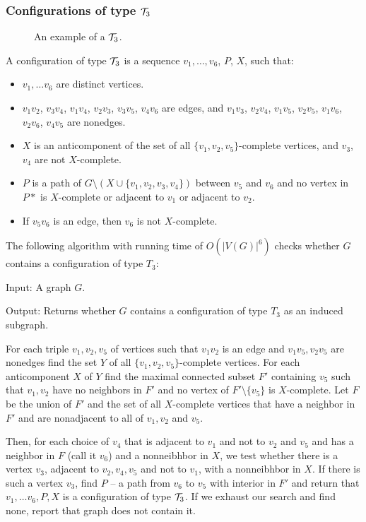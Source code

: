 \subsubsection{Configurations of type $\mathcal{T}_3$}

\begin{wrapfigure}{r}{0.35\textwidth}
	
	\caption{An example of a $\mathcal{T}_3$.}%
	\vspace{-1.5cm}
\end{wrapfigure}

A configuration of type $\mathcal{T}_3$ is a sequence $v_1, \ldots, v_6$, $P$, $X$, such that:
\begin{itemize}
	\item $v_1, \ldots v_6$ are distinct vertices.
	\item $v_1v_2$, $v_3v_4$, $v_1v_4$, $v_2v_3$, $v_3v_5$, $v_4v_6$ are edges, and $v_1v_3$, $v_2v_4$, $v_1v_5$, $v_2v_5$, $v_1v_6$, $v_2v_6$, $v_4v_5$ are nonedges.
	\item $X$ is an anticomponent of the set of all $\{v_1, v_2, v_5\}$-complete vertices, and $v_3$, $v_4$ are not $X$-complete.
	\item $P$ is a path of $G \setminus ( X \cup \{v_1, v_2, v_3, v_4\} )$ between $v_5$ and $v_6$ and no vertex in $P*$ is $X$-complete or adjacent to $v_1$ or adjacent to $v_2$.
	\item If $v_5v_6$ is an edge, then $v_6$ is not $X$-complete.
\end{itemize}

The following algorithm with running time of $O(|V(G)|^6)$ checks whether $G$ contains a configuration of type $T_3$:

\begin{alg}
	\label{alg:t3}
	Input: A graph $G$.

	\noindent Output: Returns whether $G$ contains a configuration of type $T_3$ as an induced subgraph.
\end{alg}
\begin{algtext2}

	For each triple $v_1, v_2, v_5$ of vertices such that $v_1v_2$ is an edge and $v_1v_5, v_2v_5$ are nonedges find the set $Y$ of all $\{v_1, v_2, v_5\}$-complete vertices. For each anticomponent $X$ of $Y$ find the maximal connected subset $F'$ containing $v_5$ such that $v_1, v_2$ have no neighbors in $F'$ and no vertex of $F'\setminus\{v_5\}$ is $X$-complete. Let $F$ be the union of $F'$ and the set of all $X$-complete vertices that have a neighbor in $F'$ and are nonadjacent to all of $v_1, v_2$ and $v_5$.

	Then, for each choice of $v_4$ that is adjacent to $v_1$ and not to $v_2$ and $v_5$ and has a neighbor in $F$ (call it $v_6$) and a nonneibhbor in $X$, we test whether there is a vertex $v_3$, adjacent to $v_2, v_4, v_5$ and not to $v_1$, with a nonneibhbor in $X$. If there is such a vertex $v_3$, find $P$ -- a path from $v_6$ to $v_5$ with interior in $F'$ and return that $v_1, \ldots v_6, P, X$ is a configuration of type $\mathcal{T}_3$. If we exhaust our search and find none, report that graph does not contain it.
\end{algtext2}

